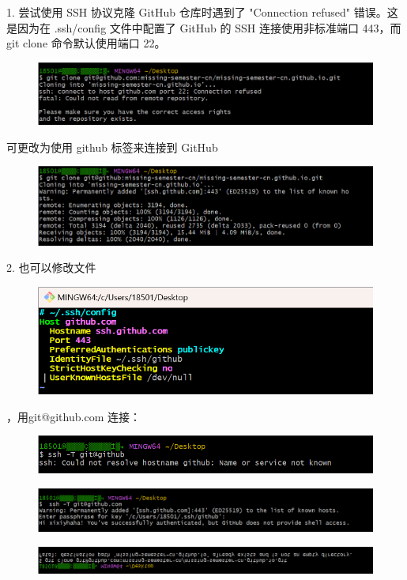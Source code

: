 \documentclass{ctexart}
\begin{document}
    1. 尝试使用 SSH 协议克隆 GitHub 仓库时遇到了 "Connection refused" 错误。这是因为在 .ssh/config 文件中配置了 GitHub 的 SSH 连接使用非标准端口 443，而 git clone 命令默认使用端口 22。
    \begin{figure}[H]
        \centering
        \includegraphics[width=18cm]{7.png}
        \caption{}
        \label{fig:25}
    \end{figure}
    可更改为使用 github 标签来连接到 GitHub
    \begin{figure}[H]
        \centering
        \includegraphics[width=18cm]{8.png}
        \caption{}
        \label{fig:26}
    \end{figure}
    \par2. 也可以修改文件
    \begin{figure}[H]
        \centering
        \includegraphics[width=18cm]{9.png}
        \caption{}
        \label{fig:27}
    \end{figure}
    ，用git@github.com 连接：
    \begin{figure}[H]
        \centering
        \includegraphics[width=18cm]{10.png}
        \caption{}
        \label{fig:28}
    \end{figure}
    \begin{figure}[H]
        \centering
        \includegraphics[width=18cm]{11.png}
        \caption{}
        \label{fig:28}
    \end{figure}
    \begin{figure}[H]
        \centering
        \includegraphics[width=18cm]{12.png}
        \caption{}
        \label{fig:28}
    \end{figure}
\end{document}
